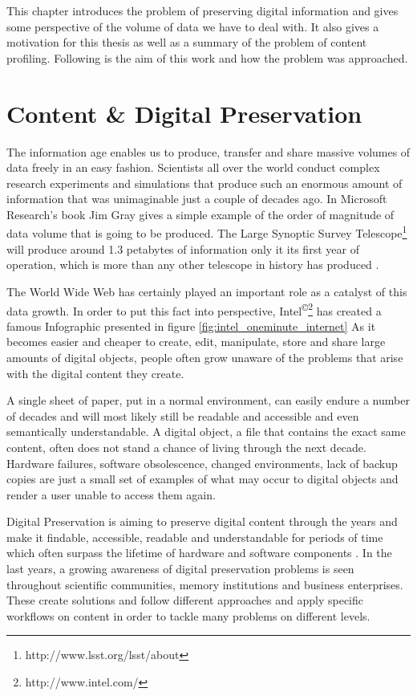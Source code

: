 This chapter introduces the problem of preserving digital information and gives some perspective of the volume of data we have to deal with. It also gives a motivation for this thesis as well as a summary of the problem of content profiling. Following is the aim of this work and how the problem was approached.

\section{Content \& Digital Preservation}
\label{ch:content_and_digital_preservation}
The information age enables us to produce, transfer and share massive volumes of data freely in an easy fashion. Scientists all over the world conduct complex research experiments and simulations that produce such an enormous amount of information that was unimaginable just a couple of decades ago. In Microsoft Research's book Jim Gray gives a simple example of the order of magnitude of data volume that is going to be produced. The Large Synoptic Survey Telescope\footnote{http://www.lsst.org/lsst/about} will produce around 1.3 petabytes of information only it its first year of operation, which is more than any other telescope in history has produced \cite{Gray:2009:fourthparadigm}.

The World Wide Web has certainly played an important role as a catalyst of this data growth. In order to put this fact into perspective, Intel\textsuperscript{\copyright}\footnote{http://www.intel.com/} has created a famous Infographic presented in figure \ref{fig:intel_oneminute_internet}
As it becomes easier and cheaper to create, edit, manipulate, store and share large amounts of digital objects, people often grow unaware of the problems that arise with the digital content they create.

A single sheet of paper, put in a normal environment, can easily endure a number of decades and will most likely still be readable and accessible and even semantically understandable. A digital object, a file that contains the exact same content, often does not stand a chance of living through the next decade. Hardware failures, software obsolescence, changed environments, lack of backup copies are just a small set of examples of what may occur to digital objects and render a user unable to access them again.

Digital Preservation is aiming to preserve digital content through the years and make it findable, accessible, readable and understandable for periods of time which often surpass the lifetime of hardware and software components \cite{DBLP:journals/dlib/RosenthalRLRM05}. In the last years, a growing awareness of digital preservation problems is seen throughout scientific communities, memory institutions and business enterprises. These create solutions and follow different approaches and apply specific workflows on content in order to tackle many problems on different levels.

